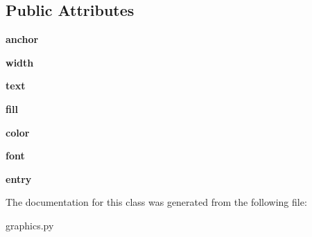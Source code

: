 \subsection*{Public Attributes}
\begin{DoxyCompactItemize}
\item 
{\bfseries anchor}\hypertarget{classgraphics_1_1_entry_a80e7267b0c2117459d13532c253e608f}{}\label{classgraphics_1_1_entry_a80e7267b0c2117459d13532c253e608f}

\item 
{\bfseries width}\hypertarget{classgraphics_1_1_entry_a3c71a6cb1110ae9da3edef095fbb61e5}{}\label{classgraphics_1_1_entry_a3c71a6cb1110ae9da3edef095fbb61e5}

\item 
{\bfseries text}\hypertarget{classgraphics_1_1_entry_ad606e7fd6c89a56ffd6c35385bc050e6}{}\label{classgraphics_1_1_entry_ad606e7fd6c89a56ffd6c35385bc050e6}

\item 
{\bfseries fill}\hypertarget{classgraphics_1_1_entry_aaa0a15f51427af10dd5adc7e0aa3d553}{}\label{classgraphics_1_1_entry_aaa0a15f51427af10dd5adc7e0aa3d553}

\item 
{\bfseries color}\hypertarget{classgraphics_1_1_entry_a96d564c2ac5f5bc21e6353f7b6e702c1}{}\label{classgraphics_1_1_entry_a96d564c2ac5f5bc21e6353f7b6e702c1}

\item 
{\bfseries font}\hypertarget{classgraphics_1_1_entry_a03940868372e90882d320d9a402dec14}{}\label{classgraphics_1_1_entry_a03940868372e90882d320d9a402dec14}

\item 
{\bfseries entry}\hypertarget{classgraphics_1_1_entry_a344bdacc19d9c10e355e21357a94c38d}{}\label{classgraphics_1_1_entry_a344bdacc19d9c10e355e21357a94c38d}

\end{DoxyCompactItemize}


The documentation for this class was generated from the following file\+:\begin{DoxyCompactItemize}
\item 
graphics.\+py\end{DoxyCompactItemize}
